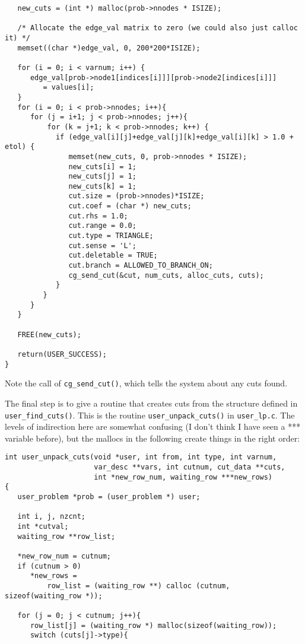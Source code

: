 \documentclass[11pt]{article}
\begin{document}
{\begin{verbatim}
   new_cuts = (int *) malloc(prob->nnodes * ISIZE);

   /* Allocate the edge_val matrix to zero (we could also just calloc it) */
   memset((char *)edge_val, 0, 200*200*ISIZE);
   
   for (i = 0; i < varnum; i++) {
      edge_val[prob->node1[indices[i]]][prob->node2[indices[i]]] 
         = values[i];
   }
   for (i = 0; i < prob->nnodes; i++){
      for (j = i+1; j < prob->nnodes; j++){
          for (k = j+1; k < prob->nnodes; k++) {
            if (edge_val[i][j]+edge_val[j][k]+edge_val[i][k] > 1.0 + etol) {
               memset(new_cuts, 0, prob->nnodes * ISIZE);
               new_cuts[i] = 1; 
               new_cuts[j] = 1;
               new_cuts[k] = 1;
               cut.size = (prob->nnodes)*ISIZE;
               cut.coef = (char *) new_cuts;
               cut.rhs = 1.0;
               cut.range = 0.0;
               cut.type = TRIANGLE;
               cut.sense = 'L';
               cut.deletable = TRUE;
               cut.branch = ALLOWED_TO_BRANCH_ON;
               cg_send_cut(&cut, num_cuts, alloc_cuts, cuts);
            }
         }
      }
   }
   
   FREE(new_cuts);
   
   return(USER_SUCCESS);
}

\end{verbatim}

Note the call of \texttt{cg\_send\_cut()}, which tells the system about any
cuts found.

The final step is to give a routine that creates cuts from the structure
defined in \texttt{user\_find\_cuts()}. This is the routine
\texttt{user\_unpack\_cuts()} in \texttt{user\_lp.c}. The levels of
indirection here are somewhat confusing (I don't think I have seen a ***
variable before), but the mallocs in the following create things in the right
order:
\begin{verbatim}
int user_unpack_cuts(void *user, int from, int type, int varnum,
                     var_desc **vars, int cutnum, cut_data **cuts,
                     int *new_row_num, waiting_row ***new_rows)
{
   user_problem *prob = (user_problem *) user;
   
   int i, j, nzcnt;
   int *cutval;
   waiting_row **row_list;
   
   *new_row_num = cutnum;
   if (cutnum > 0)
      *new_rows =
          row_list = (waiting_row **) calloc (cutnum, sizeof(waiting_row *));
   
   for (j = 0; j < cutnum; j++){
      row_list[j] = (waiting_row *) malloc(sizeof(waiting_row));
      switch (cuts[j]->type){
	 

\end{verbatim}}
\end{document}
